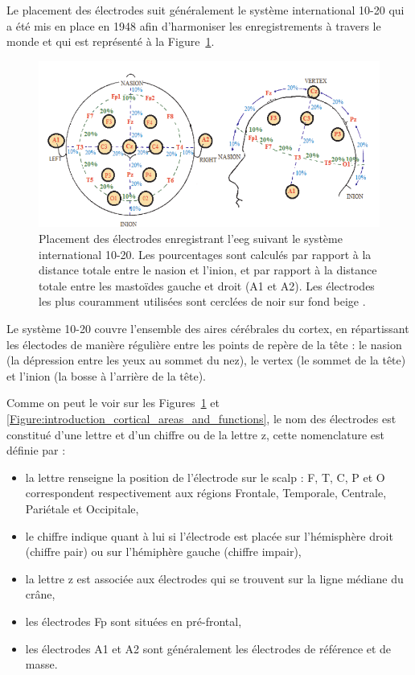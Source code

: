Le placement des électrodes suit généralement le système international 10-20 qui a été mis en place en 1948 afin d'harmoniser les enregistrements à travers le monde 
\citep{Jasper1949, Sharbrough1991} et qui est représenté à la Figure~\ref{Figure:introduction_system_10_20}.

\begin{figure}[h!]
  \centering
	\includegraphics[width=1\linewidth]{figures/chapter-1/introduction-system-10-20} 
  \caption[Placement des électrodes enregistrant l'\gls{eeg} suivant le système international 10-20.]{Placement des électrodes enregistrant l'\gls{eeg} suivant le système international 10-20. 
	Les pourcentages sont calculés par rapport à la distance totale entre le nasion
	et l'inion, et par rapport à la distance totale entre les mastoïdes gauche et droit (A1 et A2). Les électrodes les plus couramment utilisées 
	sont cerclées de noir sur fond beige \citep{Marzbani2016}.}
  \label{Figure:introduction_system_10_20}
\end{figure}

Le système 10-20 couvre l'ensemble des aires cérébrales du cortex, en répartissant les électodes de manière régulière entre les points de repère de la tête : le nasion (la 
dépression entre les yeux au sommet du nez), le vertex (le sommet de la tête) et l'inion (la bosse à l'arrière de la tête). 

Comme on peut le voir sur les Figures~\ref{Figure:introduction_system_10_20} et \ref{Figure:introduction_cortical_areas_and_functions}, le nom des électrodes est 
constitué d'une lettre et d'un chiffre ou de la lettre z, cette nomenclature est définie par \citet{Jasper1949} :
\begin{itemize}
\item la lettre renseigne la position de l'électrode sur le scalp : F, T, C, P et O correspondent respectivement aux régions Frontale, Temporale, Centrale, Pariétale et Occipitale,
\item le chiffre indique quant à lui si l'électrode est placée sur l'hémisphère droit (chiffre pair) ou sur l'hémiphère gauche (chiffre impair),
\item la lettre z est associée aux électrodes qui se trouvent sur la ligne médiane du crâne,
\item les électrodes Fp sont situées en pré-frontal,
\item les électrodes A1 et A2 sont généralement les électrodes de référence et de masse.
\end{itemize}
  
